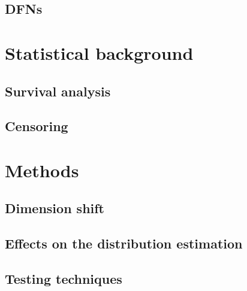 \documentclass[11pt]{article}
\begin{document}
	\subsection{DFNs}
	
	\section{Statistical background}
	
	\subsection{Survival analysis}
	\subsection{Censoring}
	
	
	\section{Methods}
	
	\subsection{Dimension shift}
	\subsection{Effects on the distribution estimation}
	\subsection{Testing techniques}
				
	
	\newpage
	\printbibliography
	
\end{document}
